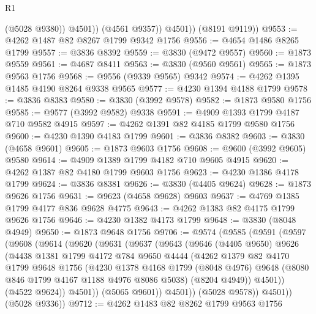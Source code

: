 \begin{lexlean}{R1}
\begin{coremodule}
                  (@5028 @9380))
                @4501))
            (@4561 @9357))
          @4501))
      (@8191 @9119))
@9553 := @4262 @1487 @82 @8267 @1799 @9342 @1756
@9556 := @4654 @1486 @8265 @1799
@9557 := @3836 @8392
@9559 := @3830 (@9472 @9557)
@9560 := @1873 @9559
@9561 := @4687 @8411
@9563 := @3830 (@9560 @9561)
@9565 := @1873 @9563 @1756
@9568 := @9556 (@9339 @9565) @9342
@9574 := @4262 @1395 @1485 @4190 @8264 @9338 @9565
@9577 := @4230 @1394 @4188 @1799
@9578 := @3836 @8383
@9580 := @3830 (@3992 @9578)
@9582 := @1873 @9580 @1756
@9585 := @9577 (@3992 @9582) @9338
@9591 := @4909 @1393 @1799 @4187 @710 @9582 @4915
@9597 := @4262 @1391 @82 @4185 @1799 @9580 @1756
@9600 := @4230 @1390 @4183 @1799
@9601 := @3836 @8382
@9603 := @3830 (@4658 @9601)
@9605 := @1873 @9603 @1756
@9608 := @9600 (@3992 @9605) @9580
@9614 := @4909 @1389 @1799 @4182 @710 @9605 @4915
@9620 := @4262 @1387 @82 @4180 @1799 @9603 @1756
@9623 := @4230 @1386 @4178 @1799
@9624 := @3836 @8381
@9626 := @3830 (@4405 @9624)
@9628 := @1873 @9626 @1756
@9631 := @9623 (@4658 @9628) @9603
@9637 := @4769 @1385 @1799 @4177 @836 @9628 @4775
@9643 := @4262 @1383 @82 @4175 @1799 @9626 @1756
@9646 := @4230 @1382 @4173 @1799
@9648 := @3830 (@8048 @4949)
@9650 := @1873 @9648 @1756
@9706 := @9574
    (@9585
      (@9591
        (@9597
          (@9608
            (@9614
              (@9620
                (@9631
                  (@9637
                    (@9643
                      (@9646
                        (@4405 @9650)
                        @9626
                        (@4438
                          @1381
                          @1799
                          @4172
                          @784
                          @9650
                          @4444
                          (@4262
                            @1379
                            @82
                            @4170
                            @1799
                            @9648
                            @1756
                            (@4230
                              @1378
                              @4168
                              @1799
                              (@8048 @4976)
                              @9648
                              (@8080 @846 @1799 @4167 @1188 @4976 @8086 @5038)
                              (@8204 @4949))
                            @4501))
                        (@4522 @9624))
                      @4501))
                  (@5065 @9601))
                @4501))
            (@5028 @9578))
          @4501))
      (@5028 @9336))
@9712 := @4262 @1483 @82 @8262 @1799 @9563 @1756

\end{coremodule}
\end{lexlean}
